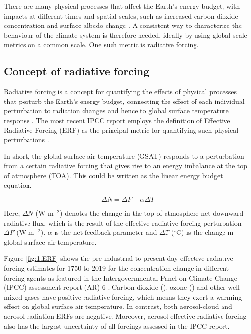 There are many physical processes that affect the Earth's energy budget, with impacts at different times and spatial scales, such as increased carbon dioxide concentration and surface albedo change \citep{forsterEarthEnergyBudget2021}. A consistent way to characterize the behaviour of the climate system is therefore needed, ideally by using global-scale metrics on a common scale. One such metric is radiative forcing.

\subsection{Concept of radiative forcing}

Radiative forcing is a concept for quantifying the effects of physical processes that perturb the Earth's energy budget, connecting the effect of each individual perturbation to radiation changes and hence to global surface temperature response \citep{thornhillEffectiveRadiativeForcing2021}. The most recent IPCC report employs the definition of Effective Radiative Forcing (ERF) as the principal metric for quantifying such physical perturbations \citep{forsterEarthEnergyBudget2021}. 

In short, the global surface air temperature (GSAT) responds to a perturbation from a certain radiative forcing that gives rise to an energy imbalance at the top of atmosphere (TOA). This could be written as the linear energy budget equation.

\begin{equation}
\label{eq:erf}
    \Delta N = \Delta F - \alpha \Delta T
\end{equation}

Here, $\Delta N$ (W m$^{-2}$) denotes the change in the top-of-atmosphere net downward radiative flux, which is the result of the effective radiative forcing perturbation $\Delta F$ (W m$^{-2}$). $\alpha$ is the net feedback parameter and $\Delta T$ ($^\circ$C) is the change in global surface air temperature. 

Figure \ref{fig:1.ERF} shows the pre-industrial to present-day effective radiative forcing estimates for 1750 to 2019 for the concentration change in different forcing agents as featured in the Intergovernmental Panel on Climate Change (IPCC) assessment report (AR) 6 \citep{forsterEarthEnergyBudget2021}. Carbon dioxide (), ozone () and other well-mixed gases have positive radiative forcing, which means they exert a warming effect on global surface air temperature. In contrast, both aerosol-cloud and aerosol-radiation ERFs are negative. Moreover, aerosol effective radiative forcing also has the largest uncertainty of all forcings assessed in the IPCC report.

